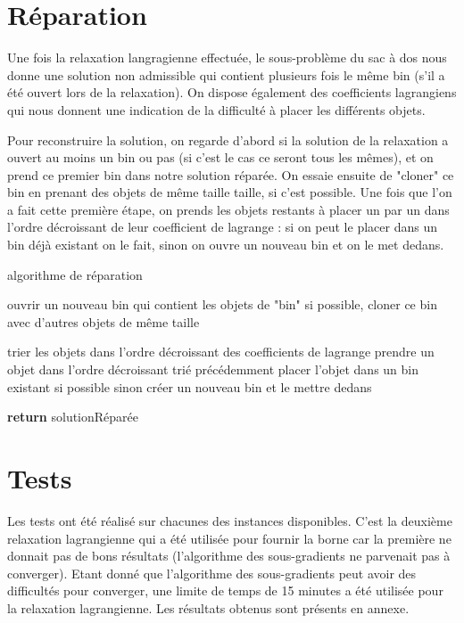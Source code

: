 \documentclass{article}
\begin{document}
\section{Réparation}

Une fois la relaxation langragienne effectuée, le sous-problème du sac à dos nous donne une solution non admissible qui contient plusieurs fois le même bin (s'il a été ouvert lors de la relaxation). On dispose également des coefficients lagrangiens qui nous donnent une indication de la difficulté à placer les différents objets.

Pour reconstruire la solution, on regarde d'abord si la solution de la relaxation a ouvert au moins un bin ou pas (si c'est le cas ce seront tous les mêmes), et on prend ce premier bin dans notre solution réparée. On essaie ensuite de "cloner" ce bin en prenant des objets de même taille taille, si c'est possible. Une fois que l'on a fait cette première étape, on prends les objets restants à placer un par un dans l'ordre décroissant de leur coefficient de lagrange : si on peut le placer dans un bin déjà existant on le fait, sinon on ouvre un nouveau bin et on le met dedans.

\begin{algorithm}
	\caption{algorithme de réparation}
	\begin{algorithmic}[1]
		\State ouvrir un nouveau bin qui contient les objets de "bin"
		\State si possible, cloner ce bin avec d'autres objets de même taille
		\EndIf

		\State trier les objets dans l'ordre décroissant des coefficients de lagrange
		\State prendre un objet dans l'ordre décroissant trié précédemment
		\State placer l'objet dans un bin existant si possible
		\State sinon créer un nouveau bin et le mettre dedans
		\EndWhile

		\State \textbf{return} solutionRéparée
		\EndFunction
	\end{algorithmic}
\end{algorithm}

\section{Tests}

Les tests ont été réalisé sur chacunes des instances disponibles.
C'est la deuxième relaxation lagrangienne qui a été utilisée pour fournir la borne car la première ne donnait pas de bons résultats (l'algorithme des sous-gradients ne parvenait pas à converger).
Etant donné que l'algorithme des sous-gradients peut avoir des difficultés pour converger, une limite de temps de 15 minutes a été utilisée pour la relaxation lagrangienne.
Les résultats obtenus sont présents en annexe.\newline
\end{document}
